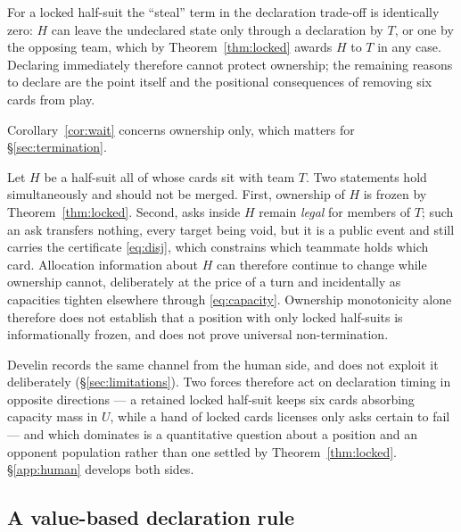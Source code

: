 \begin{corollary}
\label{cor:wait}
For a locked half-suit the ``steal'' term in the declaration trade-off is
identically zero: $H$ can leave the undeclared state only through a declaration
by $T$, or one by the opposing team, which by Theorem~\ref{thm:locked} awards $H$
to $T$ in any case. Declaring immediately therefore cannot protect ownership; the
remaining reasons to declare are the point itself and the positional consequences
of removing six cards from play.
\end{corollary}

Corollary~\ref{cor:wait} concerns ownership only, which matters for
\S\ref{sec:termination}.

\begin{observation}
\label{obs:frozeninfo}
Let $H$ be a half-suit all of whose cards sit with team $T$. Two statements hold
simultaneously and should not be merged. First, ownership of $H$ is frozen by
Theorem~\ref{thm:locked}. Second, asks inside $H$ remain \emph{legal} for members
of $T$; such an ask transfers nothing, every target being void, but it is a
public event and still carries the certificate \eqref{eq:disj}, which constrains
which teammate holds which card. Allocation information about $H$ can therefore
continue to change while ownership cannot, deliberately at the price of a turn
and incidentally as capacities tighten elsewhere through \eqref{eq:capacity}.
Ownership monotonicity alone therefore does not establish that a position with
only locked half-suits is informationally frozen, and does not prove universal
non-termination.
\end{observation}

Develin \cite{develin} records the same channel from the human side, and
\vfast{} does not exploit it deliberately (\S\ref{sec:limitations}). Two forces
therefore act on declaration timing in opposite directions --- a retained locked
half-suit keeps six cards absorbing capacity mass in $U$, while a hand of locked
cards licenses only asks certain to fail --- and which dominates is a
quantitative question about a position and an opponent population rather than one
settled by Theorem~\ref{thm:locked}. \S\ref{app:human} develops both sides.

\subsection{A value-based declaration rule}
\label{sec:stopping}

